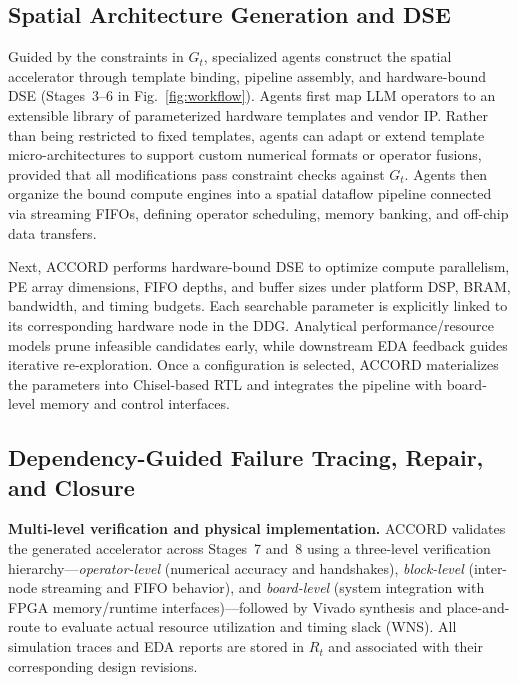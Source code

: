 \documentclass[9pt,conference]{IEEEtran}
\begin{document}
\subsection{Spatial Architecture Generation and DSE}
Guided by the constraints in $G_t$, specialized agents construct the spatial accelerator through template binding, pipeline assembly, and hardware-bound DSE (Stages~3--6 in Fig.~\ref{fig:workflow}). Agents first map LLM operators to an extensible library of parameterized hardware templates and vendor IP. Rather than being restricted to fixed templates, agents can adapt or extend template micro-architectures to support custom numerical formats or operator fusions, provided that all modifications pass constraint checks against $G_t$. Agents then organize the bound compute engines into a spatial dataflow pipeline connected via streaming FIFOs, defining operator scheduling, memory banking, and off-chip data transfers.

Next, ACCORD performs hardware-bound DSE to optimize compute parallelism, PE array dimensions, FIFO depths, and buffer sizes under platform DSP, BRAM, bandwidth, and timing budgets. Each searchable parameter is explicitly linked to its corresponding hardware node in the DDG. Analytical performance/resource models prune infeasible candidates early, while downstream EDA feedback guides iterative re-exploration. Once a configuration is selected, ACCORD materializes the parameters into Chisel-based RTL and integrates the pipeline with board-level memory and control interfaces.

\subsection{Dependency-Guided Failure Tracing, Repair, and Closure}
\textbf{Multi-level verification and physical implementation.}
ACCORD validates the generated accelerator across Stages~7 and~8 using a three-level verification hierarchy—\emph{operator-level} (numerical accuracy and handshakes), \emph{block-level} (inter-node streaming and FIFO behavior), and \emph{board-level} (system integration with FPGA memory/runtime interfaces)—followed by Vivado synthesis and place-and-route to evaluate actual resource utilization and timing slack (WNS). All simulation traces and EDA reports are stored in $R_t$ and associated with their corresponding design revisions.
\end{document}

